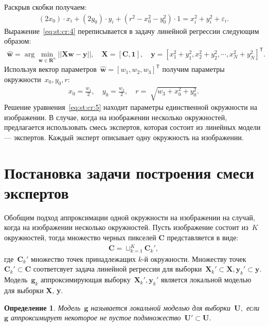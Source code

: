 \documentclass[12pt, twoside]{article}
\newtheorem{definition}{Определение}[section]
\numberwithin{equation}{section}
\begin{document}
Раскрыв скобки получаем:
\[
\label{eq:st:cr:4}
\begin{aligned}
\left(2x_0\right)\cdot x_i + \left(2y_0\right)\cdot y_i+\left(r^2-x_0^2-y_0^2\right)\cdot1 = x_{i}^2 + y_{i}^2 + \varepsilon_i.
\end{aligned}
\]
Выражение~\eqref{eq:st:cr:4} переписывается в задачу линейной регрессии следующим образом:
\[
\label{eq:st:cr:5}
\begin{aligned}
\hat{\textbf{w}} = \arg\min_{\textbf{w}\in \mathbf{R}^{n}}||\textbf{X}\textbf{w} - \textbf{y}||,  \quad \textbf{X} = \left[\textbf{C}, \textbf{1}\right], \quad \textbf{y} = \left[x_1^2+y_1^2, x_2^2+y_2^2, \cdots, x_N^2+y_N^2\right]^{\mathsf{T}}.
\end{aligned}
\]
Используя вектор параметров~$\hat{\textbf{w}} = \left[w_1, w_2, w_3\right]^{\mathsf{T}}$ получим параметры окружности~$x_0, y_0, r$:
\[
\label{eq:st:cr:6}
\begin{aligned}
x_0 = \frac{w_1}{2}, \quad y_0 = \frac{w_2}{2}, \quad r = \sqrt[]{w_3+x_{0}^{2}+y_{0}^{2}}.
\end{aligned}
\]
Решение уравнения~\eqref{eq:st:cr:5} находит параметры единственной окружности на изображении. В случае, когда на изображении несколько окружностей, предлагается использовать смесь экспертов, которая состоит из линейных модели --- экспертов. Каждый эксперт описывает одну окружность на изображении.

\section{Постановка задачи построения смеси экспертов}
Обобщим подход аппроксимации одной окружности на изображении на случай, когда на изображении несколько окружностей. Пусть изображение состоит из~$K$ окружностей, тогда множество черных пикселей $\textbf{C}$ представляется в виде:
\[
\label{eq:st:1}
\begin{aligned}
\textbf{C} = \sqcup_{k=1}^{K}\textbf{C}_{k}',
\end{aligned}
\]
где~$\textbf{C}_{k}'$ множество точек принадлежащих $k$-й окружности. Множеству точек~$\textbf{C}_{k}' \subset\textbf{C}$ соответсвует задача линейной регрессии для выборки~$\textbf{X}_{k}' \subset \textbf{X}, \textbf{y}_{k}' \subset \textbf{y}$. Модель~$\mathbf{g}_k$ аппроксимирующая выборку~$\textbf{X}_{k}', \textbf{y}_{k}'$ является локальной моделью для выборки \textbf{X}, \textbf{y}.


\begin{definition}
\label{def:1}
Модель~$\mathbf{g}$ называется локальной моделью для выборки~$\textbf{U},$ если~$\mathbf{g}$ аппроксимирует некоторое не пустое подмножество~$\textbf{U}'\subset\textbf{U}$.
\end{definition}
\end{document}
